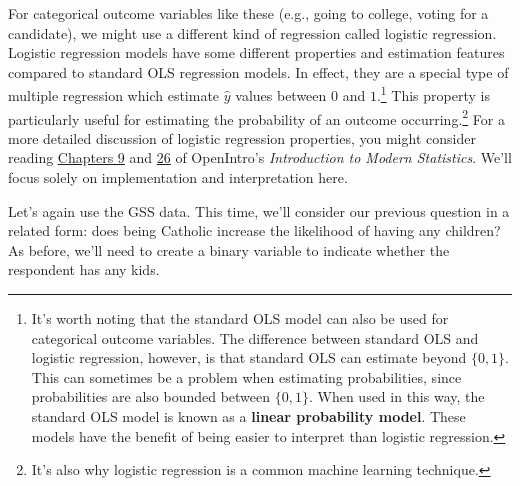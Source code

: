 \documentclass[
  letterpaper,
]{book}
\begin{document}
For categorical outcome variables like these (e.g., going to college,
voting for a candidate), we might use a different kind of regression
called logistic regression. Logistic regression models have some
different properties and estimation features compared to standard OLS
regression models. In effect, they are a special type of multiple
regression which estimate \(\widehat{y}\) values between \(0\) and
\(1\).\footnote{It's worth noting that the standard OLS model can also
  be used for categorical outcome variables. The difference between
  standard OLS and logistic regression, however, is that standard OLS
  can estimate beyond \({\{0,1\}}\). This can sometimes be a problem
  when estimating probabilities, since probabilities are also bounded
  between \({\{0,1\}}\). When used in this way, the standard OLS model
  is known as a \textbf{linear probability model}. These models have the
  benefit of being easier to interpret than logistic regression.} This
property is particularly useful for estimating the probability of an
outcome occurring.\footnote{It's also why logistic regression is a
  common machine learning technique.} For a more detailed discussion of
logistic regression properties, you might consider reading
\href{https://openintro-ims.netlify.app/model-logistic}{Chapters 9} and
\href{https://openintro-ims.netlify.app/inf-model-logistic}{26} of
OpenIntro's \emph{Introduction to Modern Statistics}. We'll focus solely
on implementation and interpretation here.

Let's again use the GSS data. This time, we'll consider our previous
question in a related form: does being Catholic increase the likelihood
of having any children? As before, we'll need to create a binary
variable to indicate whether the respondent has any kids.
\end{document}
